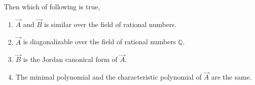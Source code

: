 \begin{enumerate}[label=\thesection.\arabic*.,ref=\thesection.\theenumi]
Then which of following is true,
\begin{enumerate}
\item $\vec{A}$ and $\vec{B}$ is similar over the field of rational numbers.
\item $\vec{A}$ is diagonalizable over the field of rational numbers $\mathbb{Q}$.
\item $\vec{B}$ is the Jordan canonical form of $\vec{A}$.
\item The minimal polynomial and the characteristic polynomial of $\vec{A}$ are the same.
\end{enumerate}
%
\solution


\end{enumerate}
